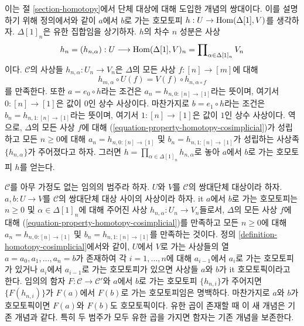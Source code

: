 \noindent
이는 절 \ref{section-homotopy}에서 단체 대상에 대해 도입한 개념의
쌍대이다. 이를 설명하기 위해 정의에서와 같이 $a$에서 $b$로 가는
호모토피 $h : U \to \mathop{\mathrm{Hom}}\nolimits(\Delta[1], V)$를 생각하자.
$\Delta[1]_n$은 유한 집합임을 상기하자. $h$의 차수 $n$ 성분은 사상
$$
h_n = (h_{n, \alpha}) :
U
\longrightarrow
\mathop{\mathrm{Hom}}\nolimits(\Delta[1], V)_n =
\prod\nolimits_{\alpha \in \Delta[1]_n} V_n
$$
이다. $\mathcal{C}$의 사상들 $h_{n, \alpha} : U_n \to V_n$은
$\Delta$의 모든 사상 $f : [n] \to [m]$에 대해
\begin{equation}
\label{equation-property-homotopy-cosimplicial}
h_{m, \alpha} \circ U(f) = V(f) \circ h_{n, \alpha \circ f}
\end{equation}
를 만족한다. 또한 $a = e_0 \circ h$라는 조건은
$a_n = h_{n, 0 : [n] \to [1]}$라는 뜻이며, 여기서
$0 : [n] \to [1]$은 값이 $0$인 상수 사상이다. 마찬가지로
$b = e_1 \circ h$라는 조건은 $b_n = h_{n, 1 : [n] \to [1]}$라는
뜻이며, 여기서 $1 : [n] \to [1]$은 값이 $1$인 상수 사상이다.
역으로, $\Delta$의 모든 사상 $f$에 대해
(\ref{equation-property-homotopy-cosimplicial})가 성립하고 모든
$n \geq 0$에 대해 $a_n = h_{n, 0 : [n] \to [1]}$ 및
$b_n = h_{n, 1 : [n] \to [1]}$가 성립하는 사상족
$\{h_{n, \alpha}\}$가 주어졌다고 하자. 그러면
$h = \prod_{\alpha \in \Delta[1]_n} h_{n, \alpha}$로 놓아
$a$에서 $b$로 가는 호모토피 $h$를 얻는다.

\begin{remark}
\label{remark-homotopy-cosimplicial-better}
$\mathcal{C}$를 아무 가정도 없는 임의의 범주라 하자. $U$와 $V$를
$\mathcal{C}$의 쌍대단체 대상이라 하자. $a, b : U \to V$를
$\mathcal{C}$의 쌍대단체 대상 사이의 사상이라 하자.
{it $a$에서 $b$로 가는 호모토피}는 $n \geq 0$ 및
$\alpha \in \Delta[1]_n$에 대해 주어진 사상
$h_{n, \alpha} : U_n \to V_n$들로서, $\Delta$의 모든 사상 $f$에 대해
(\ref{equation-property-homotopy-cosimplicial})를 만족하고 모든
$n \geq 0$에 대해 $a_n = h_{n, 0 : [n] \to [1]}$ 및
$b_n = h_{n, 1 : [n] \to [1]}$를 만족하는 것이다.
정의 \ref{definition-homotopy-cosimplicial}에서와 같이, $U$에서 $V$로
가는 사상들의 열 $a = a_0, a_1, \ldots, a_n = b$가 존재하여 각
$i = 1, \ldots, n$에 대해 $a_{i - 1}$에서 $a_i$로 가는 호모토피가
있거나 $a_i$에서 $a_{i - 1}$로 가는 호모토피가 있으면 사상들
$a$와 $b$가 {it 호모토픽}이라고 한다. 임의의 함자
$F : \mathcal{C} \to \mathcal{C}'$와 $a$에서 $b$로 가는 호모토피
$\{h_{n, i}\}$가 주어지면 $\{F(h_{n, i})\}$가 $F(a)$에서 $F(b)$로
가는 호모토피임은 명백하다. 마찬가지로 $a$와 $b$가 호모토픽이면
$F(a)$와 $F(b)$도 호모토픽이다. 유한 곱이 존재할 때 이 새 개념은
기존 개념과 같다. 특히 두 범주가 모두 유한 곱을 가지면 함자는 기존
개념을 보존한다.
\end{remark}

